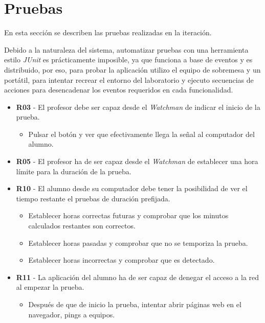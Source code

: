 \section{Pruebas}

En esta sección se describen las pruebas realizadas en la iteración.
\newline

Debido a la naturaleza del sistema, automatizar pruebas con una herramienta estilo \emph{JUnit} es prácticamente imposible, ya que funciona a base de eventos y es distribuido, por eso, para probar la aplicación utilizo el equipo de sobremesa y un portátil, para intentar recrear el entorno del laboratorio y ejecuto secuencias de acciones para desencadenar los eventos requeridos en cada funcionalidad.

\begin{itemize}

	\item {\bfseries R03} - El profesor debe ser capaz desde el \emph{Watchman} de indicar el inicio de la prueba.

    \begin{itemize}
    
        \item Pulsar el botón y ver que efectivamente llega la señal al computador del alumno.

    \end{itemize}

    \item {\bfseries R05} - El profesor ha de ser capaz desde el \emph{Watchman} de establecer una hora límite para la duración de la prueba.

    \item {\bfseries R10} - El alumno desde su computador debe tener la posibilidad de ver el tiempo restante el pruebas de duración prefijada.

    \begin{itemize}
        \item Establecer horas correctas futuras y comprobar que los minutos calculados restantes son correctos.

        \item Establecer horas pasadas y comprobar que no se temporiza la prueba.

        \item Establecer horas incorrectas y comprobar que es detectado.
    \end{itemize}


    \item {\bfseries R11} - La aplicación del alumno ha de ser capaz de denegar el acceso a la red al empezar la prueba.
        
    \begin{itemize}
    
        \item Después de que de inicio la prueba, intentar abrir páginas web en el navegador, pings a equipos.
    \end{itemize}

\end{itemize}